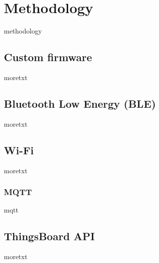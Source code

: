 
\chapter{Methodology}
methodology

\section{Custom firmware}
moretxt

\section{Bluetooth Low Energy (BLE)}
moretxt

\section{Wi-Fi}
moretxt

\subsection{MQTT}
mqtt

\section{ThingsBoard API}
moretxt
